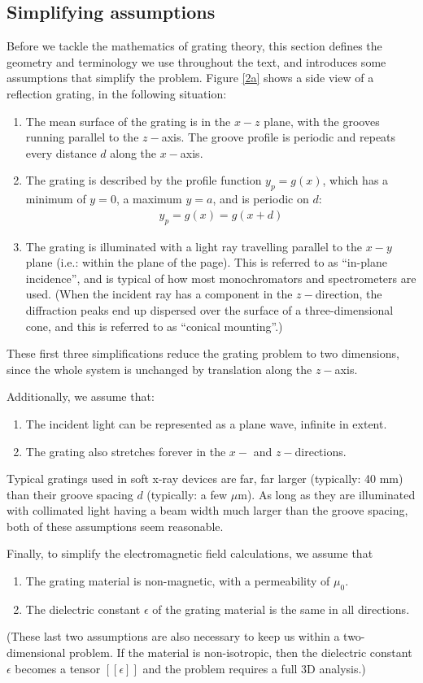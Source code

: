 \subsection{Simplifying assumptions}
\label{s_assumptions}
Before we tackle the mathematics of grating theory, this section defines the geometry and terminology we use throughout the text, and introduces some assumptions that simplify the problem.  Figure \ref{2a} shows a side view of a reflection grating, in the following situation:
\begin{enumerate}
\item The mean surface of the grating is in the $x-z$ plane, with the grooves running parallel to the $z-$axis.  The groove profile is periodic and repeats every distance $d$ along the $x-$axis.
\item The grating is described by the profile function $y_p = g(x)$, which has a minimum of $y=0$, a maximum $y=a$, and is periodic on $d$:
\begin{align}
y_p = g(x) = g(x+d)
\end{align}
\item The grating is illuminated with a light ray travelling parallel to the $x-y$ plane (i.e.: within the plane of the page). This is referred to as ``in-plane incidence'', and is typical of how most monochromators and spectrometers are used.  (When the incident ray has a component in the $z-$direction, the diffraction peaks end up dispersed over the surface of a three-dimensional cone, and this is referred to as ``conical mounting''.)
\end{enumerate}
These first three simplifications reduce the grating problem to two dimensions, since the whole system is unchanged by translation along the $z-$axis.

Additionally, we assume that:
\begin{enumerate}
\item The incident light can be represented as a plane wave, infinite in extent.  
\item The grating also stretches forever in the $x-$ and $z-$directions.

\end{enumerate}
Typical gratings used in soft x-ray devices are far, far larger (typically: 40 mm) than their groove spacing $d$ (typically: a few $\mu$m).  As long as they are illuminated with collimated light having a beam width much larger than the groove spacing, both of these assumptions seem reasonable.

Finally, to simplify the electromagnetic field calculations, we assume that
\begin{enumerate}
\item The grating material is non-magnetic, with a permeability of $\mu_0$.
\item The dielectric constant $\epsilon$ of the grating material is the same in all directions.
\end{enumerate}
(These last two assumptions are also necessary to keep us within a two-dimensional problem.  If the material is non-isotropic, then the dielectric constant $\epsilon$ becomes a tensor $\left[\left[\epsilon\right]\right]$ and the problem requires a full 3D analysis.)

